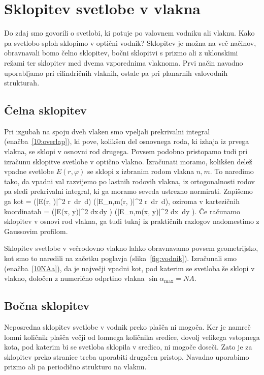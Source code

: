 \section{Sklopitev svetlobe v vlakna}
Do zdaj smo govorili o svetlobi, ki potuje po valovnem vodniku ali vlaknu. Kako pa 
svetlobo sploh sklopimo v optični vodnik? Sklopitev je možna na več načinov, obravnavali bomo 
čelno sklopitev, bočni sklopitvi s prizmo ali z uklonskimi režami ter  
sklopitev med dvema vzporednima vlaknoma. Prvi način 
navadno uporabljamo pri cilindričnih vlaknih, ostale pa pri planarnih valovodnih strukturah.

\subsection*{Čelna sklopitev}
Pri izgubah na spoju dveh vlaken smo vpeljali prekrivalni integral (enačba~\ref{10:overlap}), 
ki pove, kolikšen del osnovnega roda, ki izhaja iz prvega vlakna, se sklopi v osnovni 
rod drugega. Povsem podobno pristopamo tudi pri izračunu sklopitve svetlobe v optično vlakno. 
Izračunati moramo, kolikšen delež vpadne svetlobe $E(r, \varphi)$ se sklopi z izbranim rodom 
vlakna $n,m$. To naredimo tako, da vpadni val razvijemo po lastnih rodovih vlakna, iz ortogonalnosti
rodov pa sledi prekrivalni integral, ki ga moramo seveda ustrezno normirati. Zapišemo ga kot
\beq
\eta = 
{\left(\int |E(r, \varphi)|^2 r\, dr\, d\varphi \right) \left(\int |E_{n,m}(r, \varphi)|^2 
r\, dr\, d\varphi \right)},
\eeq
oziroma v kartezičnih koordinatah
\beq
\eta = 
{\left(\int |E(x, y)|^2 dx\,dy \right) \left(\int |E_{n,m}(x, y)|^2 
dx\, dy \right)}.
\eeq
Če računamo sklopitev v osnovi rod vlakna, ga tudi tukaj iz praktičnih razlogov nadomestimo 
z Gaussovim profilom.

\begin{remark}
Sklopitev svetlobe v večrodovno vlakno lahko obravnavamo povsem geometrijsko, kot smo to naredili
na začetku poglavja (slika~\ref{fig:vodnik}). Izračunali smo (enačba~\ref{10NAa}), da je največji 
vpadni kot, pod katerim se svetloba še sklopi v vlakno, določen z numerično odprtino 
vlakna $\sin \alpha_{\mathrm{max}}= NA$.
\end{remark}

\subsection*{Bočna sklopitev}
Neposredna sklopitev svetlobe v vodnik preko plašča ni mogoča. Ker je namreč lomni količnik
plašča večji od lomnega količnika sredice, dovolj velikega vstopnega kota, pod katerim bi 
se svetloba sklopila v sredico, ni mogoče doseči. Zato je za sklopitev preko stranice treba 
uporabiti drugačen pristop. Navadno uporabimo prizmo ali pa periodično strukturo na vlaknu. 

